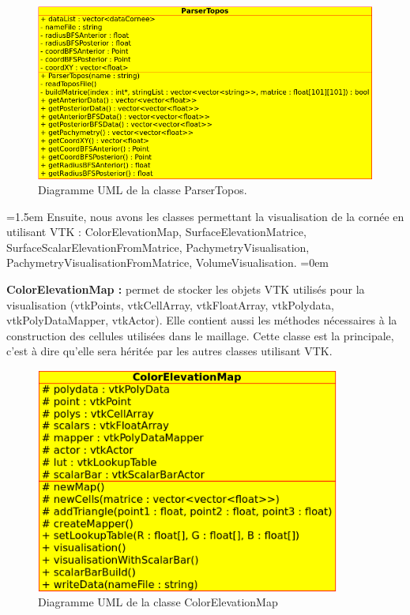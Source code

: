 \documentclass[a4paper,12pt]{article}
\begin{document}
\begin{figure}[h]
\centering
	\includegraphics[width=15cm]{ParserTopos.png} 
	\caption{Diagramme UML de la classe ParserTopos.}
\end{figure}




\vspace{0.25cm}
\parindent=1.5em
Ensuite, nous avons les classes permettant la visualisation de la cornée en utilisant VTK : ColorElevationMap, SurfaceElevationMatrice, SurfaceScalarElevationFromMatrice, PachymetryVisualisation, PachymetryVisualisationFromMatrice, VolumeVisualisation.
\parindent=0em

\textbf{ColorElevationMap : }
permet de stocker les objets VTK utilisés pour la visualisation (vtkPoints, vtkCellArray, vtkFloatArray, vtkPolydata, vtkPolyDataMapper, vtkActor). Elle contient aussi les méthodes nécessaires à la construction des cellules utilisées dans le maillage. Cette classe est la principale, c'est à dire qu'elle sera héritée par les autres classes utilisant VTK.

\begin{figure}[h]
	\centering
	\includegraphics[width=10cm]{ColorElevationMap.png} 
	\caption{Diagramme UML de la classe ColorElevationMap}
\end{figure}
\end{document}
